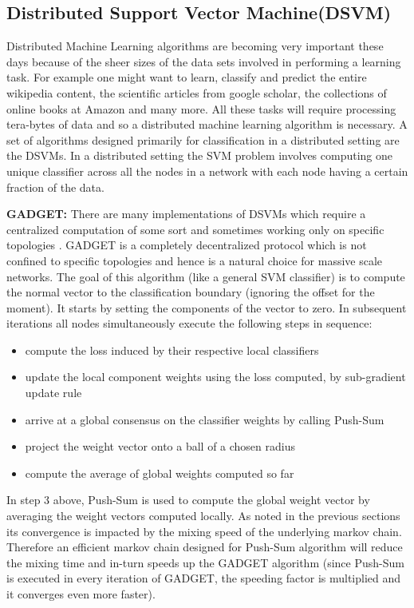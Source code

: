 \documentclass{article}
\begin{document}
\subsection{Distributed Support Vector Machine(DSVM)} 

Distributed Machine Learning algorithms are becoming very important these days because of the sheer sizes of the data sets involved in performing a learning task. For example one might want to learn, classify and predict the entire wikipedia content, the scientific articles from google scholar, the collections of online books at Amazon and many more. All these tasks will require processing tera-bytes of data and so a distributed machine learning algorithm is necessary. A set of algorithms designed primarily for classification in a distributed setting are the DSVMs. In a distributed setting the SVM \cite{cortes1995support} problem involves computing one unique classifier across all the nodes in a network with each node having a certain fraction of the data.  

\textbf{GADGET: }There are many implementations of DSVMs which require a centralized computation of some sort \cite{kokiopoulou2006distributed} and sometimes working only on specific topologies \cite{lu2008distributed}. GADGET \cite{Hensel_gadgetsvm} is a completely decentralized protocol which is not confined to specific topologies  and hence is a natural choice for massive scale networks. The goal of this algorithm (like a general SVM classifier) is to compute the normal vector to the classification boundary (ignoring the offset for the moment). It starts by setting the components of the vector to zero. In subsequent iterations all nodes simultaneously execute the following steps in sequence:  \\
\begin{itemize}
\item compute the loss induced by their respective local classifiers
\item update the local component weights using the loss computed, by sub-gradient update rule
\item arrive at a global consensus on the classifier weights by calling Push-Sum
\item project the weight vector onto a ball of a chosen radius
\item compute the average of global weights computed so far 
\end{itemize}
In step 3 above, Push-Sum is used to compute the global weight vector by averaging the weight vectors computed locally. As noted in the previous sections its convergence is impacted by the mixing speed of the underlying markov chain. Therefore an efficient markov chain designed for Push-Sum algorithm will reduce the mixing time and in-turn speeds up the GADGET algorithm (since Push-Sum is executed in every iteration of GADGET, the speeding factor is multiplied and it converges even more faster).
\end{document}
